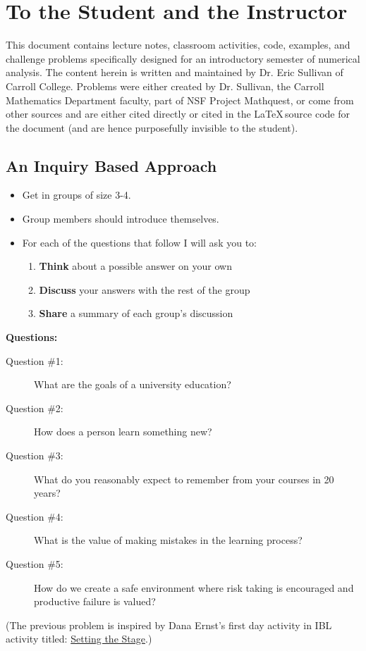 \setcounter{chapter}{-1}
\chapter{To the Student and the Instructor}
This document contains lecture notes, classroom activities, code, examples, and challenge
problems specifically designed for an introductory semester of numerical analysis.  The content
herein is written and maintained by Dr. Eric Sullivan of Carroll College.  Problems were
either created by Dr. Sullivan, the Carroll Mathematics Department faculty, part of NSF
Project Mathquest, or come from other sources and are either cited directly or cited in
the \LaTeX\,source code for the document (and are hence purposefully invisible to the
student).


\section{An Inquiry Based Approach}
\begin{problem}
    \begin{itemize}
        \item Get in groups of size 3-4.
        \item Group members should introduce themselves.
        \item For each of the questions that follow I will ask you to:
            \begin{enumerate}
                \item {\bf Think} about a possible answer on your own
                \item {\bf Discuss} your answers with the rest of the group
                \item {\bf Share} a summary of each group's discussion
            \end{enumerate}
    \end{itemize}
    {\bf Questions:} 
    \begin{description}
        \item[Question \#1:] What are the goals of a university education?
        \item[Question \#2:] How does a person learn something new?
        \item[Question \#3:] What do you reasonably expect to remember from your courses
            in 20 years?
        \item[Question \#4:] What is the value of making mistakes in the learning process?
        \item[Question \#5:] How do we create a safe environment where risk taking is
            encouraged and productive failure is valued?
    \end{description}
\end{problem}
(The previous problem is inspired by Dana Ernst's first day activity in IBL activity
titled: 
\href{http://danaernst.com/setting-the-stage/}{Setting the Stage}.)

